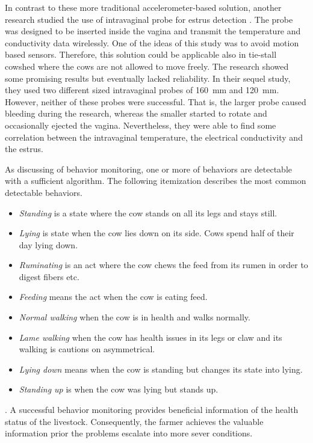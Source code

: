 \documentclass[english,12pt,a4paper,pdftex,elec,utf8]{aaltothesis}
\begin{document}
In contrast to these more traditional accelerometer-based solution,  another research studied the use of intravaginal probe for estrus detection \cite{Andersson2016101} \cite{A7370219}. The probe was designed to be inserted inside the vagina and transmit the temperature and conductivity data wirelessly. One of the ideas of this study was to avoid motion based sensors. Therefore, this solution could be applicable also in tie-stall cowshed where the cows are not allowed to move freely. The research showed some promising results but eventually lacked reliability. In their sequel study, they used two different sized intravaginal probes of \SI{160}{\milli \metre} and \SI{120}{\milli \metre}. However, neither of these probes were successful. That is, the larger probe caused bleeding during the research, whereas the smaller started to rotate and occasionally ejected the vagina. Nevertheless, they were able to find some correlation between the intravaginal temperature, the electrical conductivity and the estrus.

As discussing of behavior monitoring, one or more of  behaviors are detectable with a sufficient algorithm. The following itemization describes the most common detectable behaviors. \cite{Jonsson20116}\cite{Martiskainen200932}\cite{VazquezDiosdado2015}

\begin{itemize}
\item \textit{Standing} is a state where the cow stands on all its legs and stays still.
\item \textit{Lying} is state when the cow lies down on its side. Cows spend half of their day lying down.
\item \textit{Ruminating} is an act where the cow chews the feed from its rumen in order to digest fibers etc.
\item \textit{Feeding} means the act when the cow is eating feed.
\item \textit{Normal walking} when the cow is in health and walks normally.
\item \textit{Lame walking} when the cow has health issues in its legs or claw and its walking is cautions on asymmetrical.
\item \textit{Lying down} means when the cow is standing but changes its state into lying.
\item \textit{Standing up} is when the cow was lying but stands up.
\end{itemize}. 
A successful behavior monitoring provides beneficial information of the health status of the livestock. Consequently, the farmer achieves the valuable information prior the problems escalate into more sever conditions.
\end{document}
